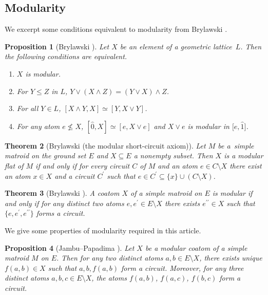 \documentclass[pdftex]{sigma}
\numberwithin{equation}{section}
\newtheorem{Theorem}{Theorem}[section]
\newtheorem{Proposition}[Theorem]{Proposition}
 { \theoremstyle{definition}
\newtheorem{Definition}[Theorem]{Definition}
\newtheorem{Example}[Theorem]{Example}
\newtheorem{Remark}[Theorem]{Remark}
\newtheorem{Question}[Theorem]{Question} }
\begin{document}
\subsection{Modularity}

We excerpt some conditions equivalent to modularity from Brylawski \cite{brylawski1975modular-totams}.
\begin{Proposition}[Brylawski {\cite[Theorem~3.3]{brylawski1975modular-totams}}]\label{brylawski modular equivalent}
Let $ X $ be an element of a geometric lattice~$ L $.
Then the following conditions are equivalent.
\begin{enumerate}[$(1)$]\itemsep=0pt
\item $ X $ is modular.
\item\label{brylawski modular equivalent 2} For $ Y \leq Z $ in $ L $, $ Y \vee (X \wedge Z) = (Y \vee X) \wedge Z $.
\item\label{brylawski modular equivalent 3} For all $ Y \in L $, $ [X \wedge Y, X] \simeq [Y, X \vee Y] $.
\item\label{brylawski modular equivalent 4} For any atom $ e \not\leq X $, $ [\hat{0}, X] \simeq [e, X \vee e] $ and $ X \vee e $ is modular in $ \big[e, \hat{1}\big] $.
\end{enumerate}
\end{Proposition}


\begin{Theorem}[Brylawski {\cite[Theorem 3.11]{brylawski1975modular-totams}} (the modular short-circuit axiom)]\label{Brylawsky modular short-circuit axiom}
Let $ M $ be a~simple matroid on the ground set $ E $ and $ X \subseteq E $ a nonempty subset.
Then $ X $ is a modular flat of $ M $ if and only if for every circuit $ C $ of $ M $ and an atom $ e \in C \setminus X $ there exist an atom $ x \in X $ and a circuit $ C^{\prime} $ such that $ e \in C^{\prime} \subseteq \{x\} \cup (C \setminus X) $.
\end{Theorem}

\begin{Theorem}[{Brylawski \cite[Corollary 3.4]{brylawski1975modular-totams}}]\label{Brylawski modular coatom}
A coatom $ X $ of a simple matroid on $ E $ is modular if and only if for any distinct two atoms $ e, e^{\prime} \in E\setminus X $ there exists $ e^{\prime\prime} \in X $ such that $ \{e,e^{\prime},e^{\prime\prime}\} $ forms a circuit.
\end{Theorem}

We give some properties of modularity required in this article.
\begin{Proposition}[{Jambu--Papadima \cite[Lemmas~1.3 and~1.9]{jambu1998generalization-t}}]\label{Jambu-Papadima}
Let $ X $ be a modular coatom of a simple matroid $ M $ on $ E $. Then for any two distinct atoms $a,b \in E\setminus X $, there exists unique $ f(a,b) \in X $ such that $ a,b,f(a,b) $ form a circuit.
Moreover, for any three distinct atoms $ a,b,c \in E\setminus X $, the atoms $ f(a,b)$, $f(a,c)$, $f(b,c) $ form a circuit.
\end{Proposition}
\end{document}
